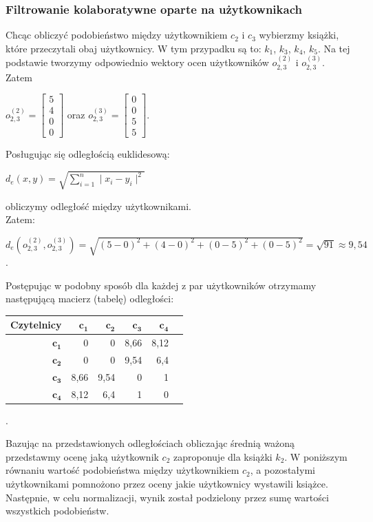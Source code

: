 \documentclass[12pt,a4paper]{report}
\begin{document}
{\subsubsection*{Filtrowanie kolaboratywne oparte na użytkownikach}
Chcąc obliczyć podobieństwo między użytkownikiem $c_2$ i $c_3$ wybierzmy książki, które przeczytali obaj użytkownicy. W tym przypadku są to: $k_1$, $k_3$, $k_4$, $k_5$. Na tej podstawie tworzymy odpowiednio wektory ocen użytkowników $o_{2,3} ^{(2)}$ i $o_{2,3}^{(3)}$. 
\\Zatem
\begin{center}
$o_{2,3} ^{(2)}= \left[
        \begin{array}{c}
         5 \\
         4 \\
         0 \\
         0
         \end{array}
      \right]$ oraz $o_{2,3}^{(3)} = \left[
        \begin{array}{c}
         0 \\
         0 \\
         5 \\
         5
         \end{array}
      \right]$.
\end{center}
Posługując się odległością euklidesową:
\begin{center}
$d_{e}(x,y) = \sqrt{\sum_{i=1}^n \mid x_{i} - y_{i} \mid ^2 }$
\end{center}
obliczymy odległość między użytkownikami.
\\Zatem: 
\begin{center}
$d_{e}(o_{2,3}^{(2)},o_{2,3}^{(3)}) = \sqrt{(5-0)^2 + (4-0)^2 + (0-5)^2 + (0-5)^2} = \sqrt{91} \approx 9,54$.
\end{center}
Postępując w podobny sposób dla każdej z par użytkowników otrzymamy następującą macierz (tabelę) odległości:
\begin{center}
\begin{tabular}{|r|r|r|r|r|r|} \hline
\textbf{Czytelnicy} & $\mathbf{c_1}$ & $\mathbf{c_2}$ & $\mathbf{c_3}$ & $\mathbf{c_4}$ \\
\hline
$\mathbf{c_1}$ & 0 & 0 & 8,66 & 8,12 \\
\hline
$\mathbf{c_2}$ & 0 & 0 & 9,54 &  6,4\\
\hline
$\mathbf{c_3}$ & 8,66 & 9,54 & 0 & 1  \\
\hline
$\mathbf{c_4}$ & 8,12 & 6,4 & 1 & 0 \\
\hline 
\end{tabular}.
\end{center}
Bazując na przedstawionych odległościach obliczając średnią ważoną przedstawmy ocenę jaką użytkownik $c_2$ zaproponuje dla książki $k_2$. W poniższym równaniu wartość podobieństwa między użytkownikiem $c_2$, a pozostałymi użytkownikami pomnożono przez oceny jakie użytkownicy wystawili książce. Następnie, w celu normalizacji, wynik został podzielony przez sumę wartości wszystkich podobieństw.
\begin{center}


\end{center}}
\end{document}
